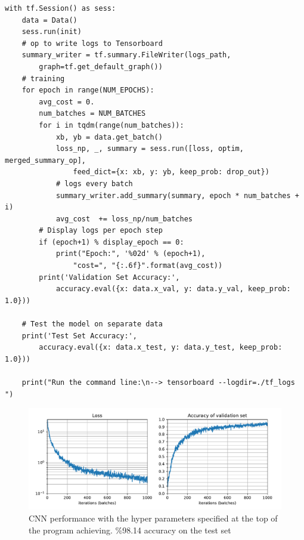 \documentclass[10pt,a4paper]{article}
\begin{document}
\begin{verbatim}
with tf.Session() as sess:
    data = Data()
    sess.run(init)
    # op to write logs to Tensorboard
    summary_writer = tf.summary.FileWriter(logs_path,
        graph=tf.get_default_graph())
    # training
    for epoch in range(NUM_EPOCHS):
        avg_cost = 0.
        num_batches = NUM_BATCHES
        for i in tqdm(range(num_batches)):
            xb, yb = data.get_batch()
            loss_np, _, summary = sess.run([loss, optim, merged_summary_op],
                feed_dict={x: xb, y: yb, keep_prob: drop_out})
            # logs every batch
            summary_writer.add_summary(summary, epoch * num_batches + i)
            avg_cost  += loss_np/num_batches
        # Display logs per epoch step
        if (epoch+1) % display_epoch == 0:
            print("Epoch:", '%02d' % (epoch+1),
                "cost=", "{:.6f}".format(avg_cost))
        print('Validation Set Accuracy:',
            accuracy.eval({x: data.x_val, y: data.y_val, keep_prob: 1.0}))

    # Test the model on separate data
    print('Test Set Accuracy:',
        accuracy.eval({x: data.x_test, y: data.y_test, keep_prob: 1.0}))

    print("Run the command line:\n--> tensorboard --logdir=./tf_logs ")
\end{verbatim}

\begin{figure}[h]
\centering
\includegraphics[width=\textwidth]{Figure_1.pdf}
\caption{CNN performance with the hyper parameters specified at the top of the program achieving. \%98.14 accuracy on the test set}
\end{figure}
\end{document}
